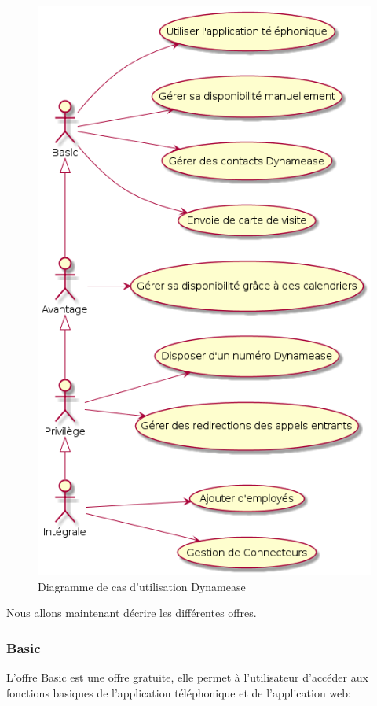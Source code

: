 \begin{figure}[!h]
	\includegraphics[scale=0.5]{img/useCase.png}
	\caption{\label{useCase} Diagramme de cas d'utilisation Dynamease}
\end{figure}

Nous allons maintenant décrire les différentes offres.

\subsubsection{Basic}

L'offre Basic est une offre gratuite, elle permet à l'utilisateur d'accéder aux fonctions basiques de l'application téléphonique et de l'application web:

